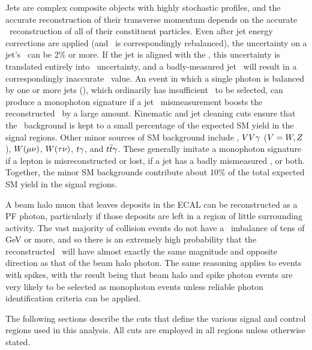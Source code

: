 Jets are complex composite objects with highly stochastic profiles, and the accurate reconstruction of their transverse momentum depends on the accurate \pT\ reconstruction
of all of their constituent particles. Even after jet energy corrections are applied (and \vecMET\ is correspondingly
rebalanced), the uncertainty on a jet's \pT\ can be 2\% or more. If the jet is aligned with the \vecMET, this uncertainty is translated entirely into \MET\ uncertainty,
and a badly-measured jet \pT\ will result in a correspondingly inaccurate \MET\ value. An event in which a single photon is balanced by one or more jets (\gjets), which ordinarily has
insufficient \MET\ to be selected, can produce a monophoton signature if a jet \pT\ mismeasurement boosts the reconstructed \MET\ by a large amount. Kinematic and jet
cleaning cuts ensure that the \gjets\ background is kept to a small percentage of the expected SM yield in the signal regions.
Other minor sources of SM background include \zllg, $VV\gamma$ ($V = W,Z$), $W(\mu\nu)$, $W(\tau\nu)$, $t\gamma$, and $t\bar{t}\gamma$. These generally imitate
a monophoton signature if a lepton is misreconstructed or lost, if a jet has a badly mismeasured \pT, or both. Together, the minor SM backgrounds contribute about 10\% of the total
expected SM yield in the signal regions.

A beam halo muon that leaves deposits in the ECAL can be reconstructed as a PF photon, particularly if those deposits are left in a region of little surrounding activity.
The vast majority of collision events do not have a \pT\ imbalance of tens of \unit{GeV} or more, and so there is an extremely high probability that the reconstructed \MET\ will
have almost exactly the same magnitude and opposite direction as that of the beam halo photon. The same reasoning applies to events with spikes, with the result being that beam
halo and spike photon events are very likely to be selected as monophoton events unless reliable photon identification criteria can be applied.

The following sections describe the cuts that define the various signal and control regions used in this analysis. All cuts are employed in all regions unless
otherwise stated.

